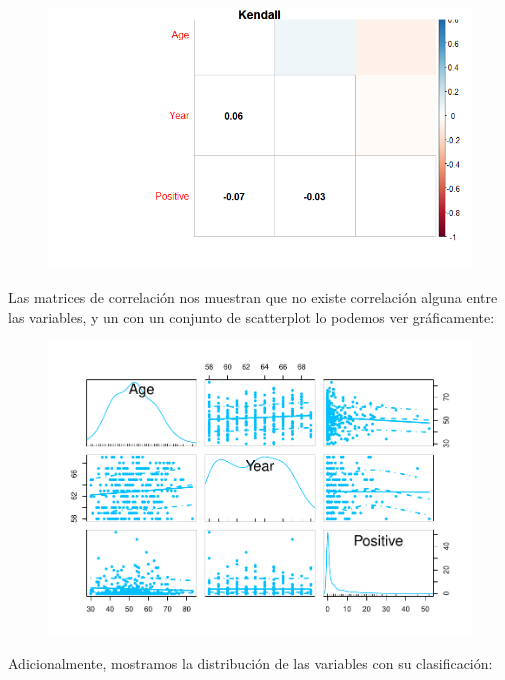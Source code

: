 \begin{figure}[H]\includegraphics[width=\linewidth]{img/EDA2_files/corr2.png} \end{figure}

\newpage

Las matrices de correlación nos muestran que no existe correlación alguna entre las variables, y un con un conjunto de scatterplot lo podemos ver gráficamente:

\begin{figure}[H]\includegraphics[width=.9\linewidth]{img/EDA2_files/figure-latex/unnamed-chunk-28-1} \end{figure}


Adicionalmente, mostramos la distribución de las variables con su clasificación:

